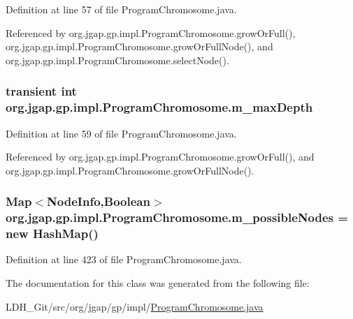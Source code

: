 Definition at line 57 of file Program\-Chromosome.\-java.



Referenced by org.\-jgap.\-gp.\-impl.\-Program\-Chromosome.\-grow\-Or\-Full(), org.\-jgap.\-gp.\-impl.\-Program\-Chromosome.\-grow\-Or\-Full\-Node(), and org.\-jgap.\-gp.\-impl.\-Program\-Chromosome.\-select\-Node().

\hypertarget{classorg_1_1jgap_1_1gp_1_1impl_1_1_program_chromosome_add5812f1aa24a114aa44923db580b919}{
\subsubsection[{m\-\_\-max\-Depth}]{\setlength{\rightskip}{0pt plus 5cm}transient int org.\-jgap.\-gp.\-impl.\-Program\-Chromosome.\-m\-\_\-max\-Depth\hspace{0.3cm}{\ttfamily [private]}}}\label{classorg_1_1jgap_1_1gp_1_1impl_1_1_program_chromosome_add5812f1aa24a114aa44923db580b919}


Definition at line 59 of file Program\-Chromosome.\-java.



Referenced by org.\-jgap.\-gp.\-impl.\-Program\-Chromosome.\-grow\-Or\-Full(), and org.\-jgap.\-gp.\-impl.\-Program\-Chromosome.\-grow\-Or\-Full\-Node().

\hypertarget{classorg_1_1jgap_1_1gp_1_1impl_1_1_program_chromosome_a42c376b973ad38ab97754447406a5480}{
\subsubsection[{m\-\_\-possible\-Nodes}]{\setlength{\rightskip}{0pt plus 5cm}Map$<${\bf Node\-Info},Boolean$>$ org.\-jgap.\-gp.\-impl.\-Program\-Chromosome.\-m\-\_\-possible\-Nodes = new Hash\-Map()\hspace{0.3cm}{\ttfamily [private]}}}\label{classorg_1_1jgap_1_1gp_1_1impl_1_1_program_chromosome_a42c376b973ad38ab97754447406a5480}


Definition at line 423 of file Program\-Chromosome.\-java.



The documentation for this class was generated from the following file\-:\begin{DoxyCompactItemize}
\item 
L\-D\-H\-\_\-\-Git/src/org/jgap/gp/impl/\hyperlink{_program_chromosome_8java}{Program\-Chromosome.\-java}\end{DoxyCompactItemize}
